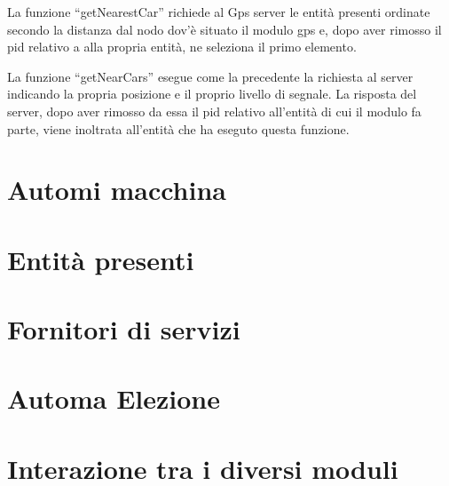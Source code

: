 La funzione ``getNearestCar'' richiede al Gps server le entità presenti ordinate secondo la distanza dal nodo dov'è situato il modulo gps e, dopo aver rimosso il pid relativo a alla propria entità, ne seleziona il primo elemento. 

La funzione ``getNearCars'' esegue come la precedente la richiesta al server indicando la propria posizione e il proprio livello di segnale. La risposta del server, dopo aver rimosso da essa il pid relativo all'entità di cui il modulo fa parte, viene inoltrata all'entità che ha eseguto questa funzione.

\section{Automi macchina}

\section{Entità presenti}

\section{Fornitori di servizi}

\section{Automa Elezione}

\section{Interazione tra i diversi moduli}

